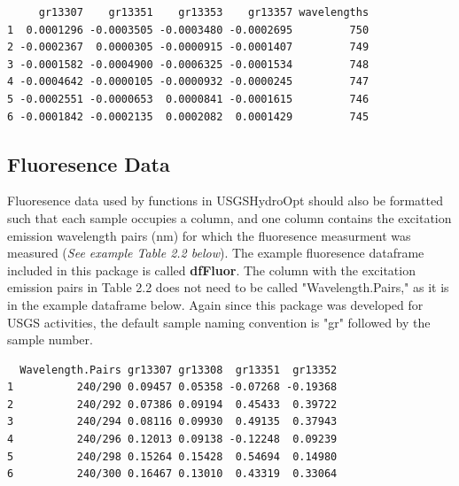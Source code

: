 \documentclass[a4paper,11pt]{article}\usepackage[]{graphicx}\usepackage[]{color}
\makeatletter
\newenvironment{kframe}{%
 \def\at@end@of@kframe{}%
 \ifinner\ifhmode%
  \def\at@end@of@kframe{\end{minipage}}%
  \begin{minipage}{\columnwidth}%
 \fi\fi%
 \def\FrameCommand##1{\hskip\@totalleftmargin \hskip-\fboxsep
 \colorbox{shadecolor}{##1}\hskip-\fboxsep
     \hskip-\linewidth \hskip-\@totalleftmargin \hskip\columnwidth}%
 \MakeFramed {\advance\hsize-\width
   \@totalleftmargin\z@ \linewidth\hsize
   \@setminipage}}%
 {\par\unskip\endMakeFramed%
 \at@end@of@kframe}
\newenvironment{knitrout}{}{} %
\makeatother
\begin{document}
\begin{knitrout}
\color{fgcolor}\begin{kframe}
\begin{verbatim}
     gr13307    gr13351    gr13353    gr13357 wavelengths
1  0.0001296 -0.0003505 -0.0003480 -0.0002695         750
2 -0.0002367  0.0000305 -0.0000915 -0.0001407         749
3 -0.0001582 -0.0004900 -0.0006325 -0.0001534         748
4 -0.0004642 -0.0000105 -0.0000932 -0.0000245         747
5 -0.0002551 -0.0000653  0.0000841 -0.0001615         746
6 -0.0001842 -0.0002135  0.0002082  0.0001429         745
\end{verbatim}
\end{kframe}
\end{knitrout}

\subsection{Fluoresence Data}
Fluoresence data used by functions in USGSHydroOpt should also be formatted such that each sample occupies a column, and one column contains the excitation emission wavelength pairs (nm) for which the fluoresence measurment was measured (\emph{See example Table 2.2 below}). The example fluoresence dataframe included in this package is called \textbf{dfFluor}. The column with the excitation emission pairs in Table 2.2 does not need to be called "Wavelength.Pairs," as it is in the example dataframe below. Again since this package was developed for USGS activities, the default sample naming convention is "gr" followed by the sample number.

\begin{knitrout}
\color{fgcolor}\begin{kframe}
\begin{verbatim}
  Wavelength.Pairs gr13307 gr13308  gr13351  gr13352
1          240/290 0.09457 0.05358 -0.07268 -0.19368
2          240/292 0.07386 0.09194  0.45433  0.39722
3          240/294 0.08116 0.09930  0.49135  0.37943
4          240/296 0.12013 0.09138 -0.12248  0.09239
5          240/298 0.15264 0.15428  0.54694  0.14980
6          240/300 0.16467 0.13010  0.43319  0.33064
\end{verbatim}
\end{kframe}
\end{knitrout}
\end{document}
